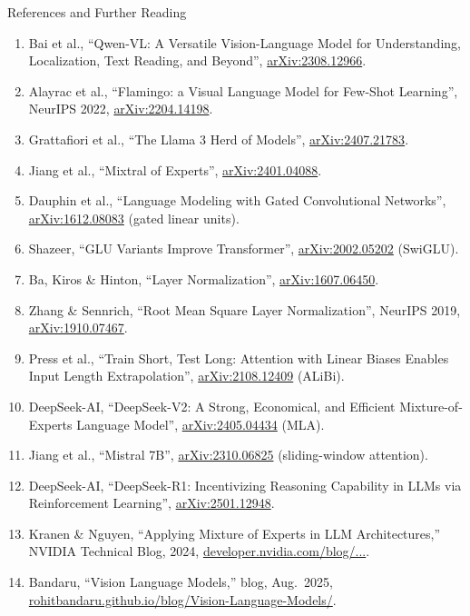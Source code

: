 \begin{frame}[allowframebreaks,t]{References and Further Reading}
\begin{enumerate}
    \item Bai et al., ``Qwen-VL: A Versatile Vision-Language Model for Understanding, Localization, Text Reading, and Beyond'', \href{https://arxiv.org/abs/2308.12966}{arXiv:2308.12966}.
    \item Alayrac et al., ``Flamingo: a Visual Language Model for Few-Shot Learning'', NeurIPS 2022, \href{https://arxiv.org/abs/2204.14198}{arXiv:2204.14198}.
    \item Grattafiori et al., ``The Llama 3 Herd of Models'', \href{https://arxiv.org/abs/2407.21783}{arXiv:2407.21783}.
    \item Jiang et al., ``Mixtral of Experts'', \href{https://arxiv.org/abs/2401.04088}{arXiv:2401.04088}.
    \item Dauphin et al., ``Language Modeling with Gated Convolutional Networks'', \href{https://arxiv.org/abs/1612.08083}{arXiv:1612.08083} (gated linear units).
    \item Shazeer, ``GLU Variants Improve Transformer'', \href{https://arxiv.org/abs/2002.05202}{arXiv:2002.05202} (SwiGLU).
    \item Ba, Kiros \& Hinton, ``Layer Normalization'', \href{https://arxiv.org/abs/1607.06450}{arXiv:1607.06450}.
    \item Zhang \& Sennrich, ``Root Mean Square Layer Normalization'', NeurIPS 2019, \href{https://arxiv.org/abs/1910.07467}{arXiv:1910.07467}.
    \item Press et al., ``Train Short, Test Long: Attention with Linear Biases Enables Input Length Extrapolation'', \href{https://arxiv.org/abs/2108.12409}{arXiv:2108.12409} (ALiBi).
    \item DeepSeek-AI, ``DeepSeek-V2: A Strong, Economical, and Efficient Mixture-of-Experts Language Model'', \href{https://arxiv.org/abs/2405.04434}{arXiv:2405.04434} (MLA).
    \item Jiang et al., ``Mistral 7B'', \href{https://arxiv.org/abs/2310.06825}{arXiv:2310.06825} (sliding-window attention).
    \item DeepSeek-AI, ``DeepSeek-R1: Incentivizing Reasoning Capability in LLMs via Reinforcement Learning'', \href{https://arxiv.org/abs/2501.12948}{arXiv:2501.12948}.
    \item Kranen \& Nguyen, ``Applying Mixture of Experts in LLM Architectures,'' NVIDIA Technical Blog, 2024, \href{https://developer.nvidia.com/blog/applying-mixture-of-experts-in-llm-architectures/}{developer.nvidia.com/blog/...}.
    \item Bandaru, ``Vision Language Models,'' blog, Aug.\ 2025, \href{https://rohitbandaru.github.io/blog/Vision-Language-Models/}{rohitbandaru.github.io/blog/Vision-Language-Models/}.

\end{enumerate}
\end{frame}
